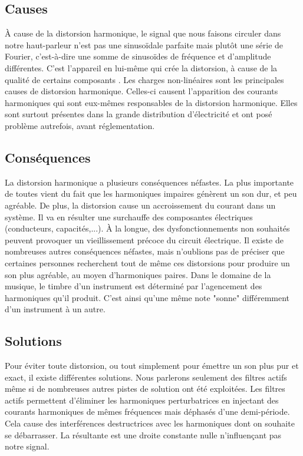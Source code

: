 \subsection{Causes}
À cause de la distorsion harmonique, le signal que nous faisons circuler dans notre haut-parleur n'est pas
une sinusoïdale parfaite mais plutôt une série de Fourier, c'est-à-dire une somme de sinusoïdes de 
fréquence et d'amplitude différentes. C'est l'appareil en lui-même qui crée la distorsion, à cause de la qualité
de certains composants\cite{cuccia} \cite{termans}.
Les charges non-linéaires sont les principales causes de distorsion harmonique. Celles-ci causent 
l'apparition des courants harmoniques qui sont eux-mêmes responsables de la distorsion harmonique. Elles sont 
surtout présentes dans la grande distribution d'électricité et ont posé problème autrefois, avant réglementation\cite{chargeslin}.

\subsection{Conséquences}
La distorsion harmonique a plusieurs conséquences néfastes.
La plus importante de toutes vient du fait que les harmoniques impaires génèrent un son dur, et peu agréable. De plus, la distorsion cause un accroissement 
du courant dans un système. Il va en résulter une surchauffe des composantes électriques (conducteurs, 
capacités,...). À la longue, des dysfonctionnements non souhaités peuvent provoquer un vieillissement 
précoce du circuit électrique\cite{brevet2}. Il existe de nombreuses autres conséquences néfastes, 
mais n'oublions pas de préciser que certaines personnes recherchent tout de même ces distorsions pour 
produire un son plus agréable, au moyen d'harmoniques paires. Dans le domaine de la musique, le timbre 
d'un instrument est déterminé par l'agencement des harmoniques qu'il produit. C'est ainsi qu'une même note
"sonne" différemment d'un instrument à un autre.

\subsection{Solutions}
Pour éviter toute distorsion, ou tout simplement pour émettre un son plus pur et exact, 
il existe différentes solutions. Nous parlerons seulement des filtres actifs 
même si de nombreuses autres pistes de solution ont été exploitées.
Les filtres actifs permettent d'éliminer les harmoniques perturbatrices en injectant des courants
harmoniques de mêmes fréquences mais déphasés d'une demi-période. Cela cause des interférences
destructrices avec les harmoniques dont on souhaite se débarrasser. La résultante est une droite constante
nulle n'influençant pas notre signal\cite{brevet1}.





